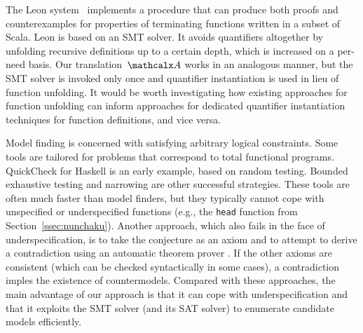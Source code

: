 The Leon system~\cite{blanc2013overview} implements a procedure that can
produce both proofs and counter\-examples for properties of terminating functions
written in a subset of Scala. Leon is based on an SMT solver. It avoids
quantifiers altogether by unfolding recursive definitions up to a certain
depth, which is increased on a per-need basis.
Our translation~$\conv$ works in an analogous manner,
but the SMT solver is invoked only once
and quantifier instantiation is used in lieu of function unfolding.
It would be
worth investigating how existing approaches for function
unfolding can inform approaches for dedicated quantifier instantiation
techniques for function definitions, and vice versa.

Model finding is concerned with satisfying arbitrary logical constraints. Some
tools are tailored for problems that correspond to total functional
programs. QuickCheck \cite{claessen-hughes-2000} for Haskell is an
early example, based on random testing. Bounded exhaustive testing
\cite{runciman-et-al-2008} and narrowing
\cite{lindblad-2008-testing} are other successful strategies. These
tools are often much faster than model finders, but they typically cannot cope
with unspecified or underspecified functions (e.g., the \texttt{head} function from
Section~\ref{ssec:nunchaku}).
Another approach, which also fails in the face of underspecification,
is to take the conjecture as an axiom and to attempt to derive a contradiction
using an automatic theorem prover \cite{baumgartner2013}. If the other axioms
are consistent (which can be checked syntactically in some cases),
a contradiction imples the existence of countermodels. Compared with these
approaches, the main advantage of our approach is that it can cope with
underspecification and that it exploits the SMT solver (and its SAT solver) to
enumerate candidate models efficiently.





%
%
%

